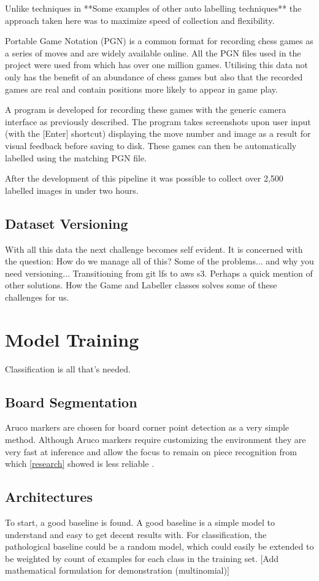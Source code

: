 Unlike techniques in \cite{}  **Some examples of other auto labelling techniques**
the approach taken here was to maximize speed of collection and flexibility.

Portable Game Notation (PGN) is a common format for recording chess games as a 
series of moves and are widely available online.  All the PGN files used in the 
project were used from \cite{} which has over one million games.  Utilising this
data not only has the benefit of an abundance of chess games but also that the 
recorded games are real and contain positions more likely to appear in game play. 

A program is developed for recording these games with the generic camera interface
as previously described.  The program takes screenshots upon user input (with the
[Enter] shortcut) displaying the move number and image as a result for visual feedback
before saving to disk.  These games can then be automatically labelled using the matching
PGN file.

After the development of this pipeline it was possible to collect over 2,500 labelled
images in under two hours.

\subsection{Dataset Versioning}
With all this data the next challenge becomes self evident.
It is concerned with the question: How do we manage all of this?
Some of the problems... and why you need versioning...
Transitioning from git lfs to aws s3.  Perhaps a quick mention of other solutions.
How the Game and Labeller classes solves some of these challenges for us.


\section{Model Training}
Classification is all that's needed.

\subsection{Board Segmentation}
Aruco markers are chosen for board corner point detection as a very simple method.
Although Aruco markers require customizing the environment they are very fast at 
inference and allow the focus to remain on piece recognition from which
\autoref{research} showed is less reliable \cite{}.

\subsection{Architectures}
To start, a good baseline is found.  A good baseline is a simple model to understand and easy to get decent results with.
For classification, the pathological baseline could be a random model, which could easily be extended to be weighted by 
count of examples for each class in the training set.  [Add mathematical formulation for demonstration (multinomial)]

